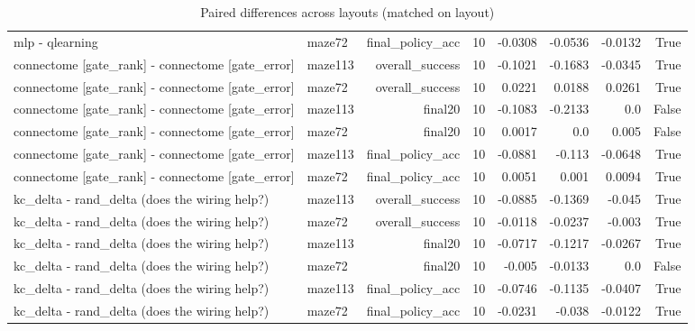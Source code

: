 \begin{table}[t]
\begin{tabular}{llrrrrrr}
mlp - qlearning & maze72 & final\_policy\_acc & 10 & -0.0308 & -0.0536 & -0.0132 & True \\
connectome [gate\_rank] - connectome [gate\_error] & maze113 & overall\_success & 10 & -0.1021 & -0.1683 & -0.0345 & True \\
connectome [gate\_rank] - connectome [gate\_error] & maze72 & overall\_success & 10 & 0.0221 & 0.0188 & 0.0261 & True \\
connectome [gate\_rank] - connectome [gate\_error] & maze113 & final20 & 10 & -0.1083 & -0.2133 & 0.0 & False \\
connectome [gate\_rank] - connectome [gate\_error] & maze72 & final20 & 10 & 0.0017 & 0.0 & 0.005 & False \\
connectome [gate\_rank] - connectome [gate\_error] & maze113 & final\_policy\_acc & 10 & -0.0881 & -0.113 & -0.0648 & True \\
connectome [gate\_rank] - connectome [gate\_error] & maze72 & final\_policy\_acc & 10 & 0.0051 & 0.001 & 0.0094 & True \\
kc\_delta - rand\_delta (does the wiring help?) & maze113 & overall\_success & 10 & -0.0885 & -0.1369 & -0.045 & True \\
kc\_delta - rand\_delta (does the wiring help?) & maze72 & overall\_success & 10 & -0.0118 & -0.0237 & -0.003 & True \\
kc\_delta - rand\_delta (does the wiring help?) & maze113 & final20 & 10 & -0.0717 & -0.1217 & -0.0267 & True \\
kc\_delta - rand\_delta (does the wiring help?) & maze72 & final20 & 10 & -0.005 & -0.0133 & 0.0 & False \\
kc\_delta - rand\_delta (does the wiring help?) & maze113 & final\_policy\_acc & 10 & -0.0746 & -0.1135 & -0.0407 & True \\
kc\_delta - rand\_delta (does the wiring help?) & maze72 & final\_policy\_acc & 10 & -0.0231 & -0.038 & -0.0122 & True \\
\bottomrule
\end{tabular}
\caption{Paired differences across layouts (matched on layout)}
\label{tab:layouts_paired}
\end{table}